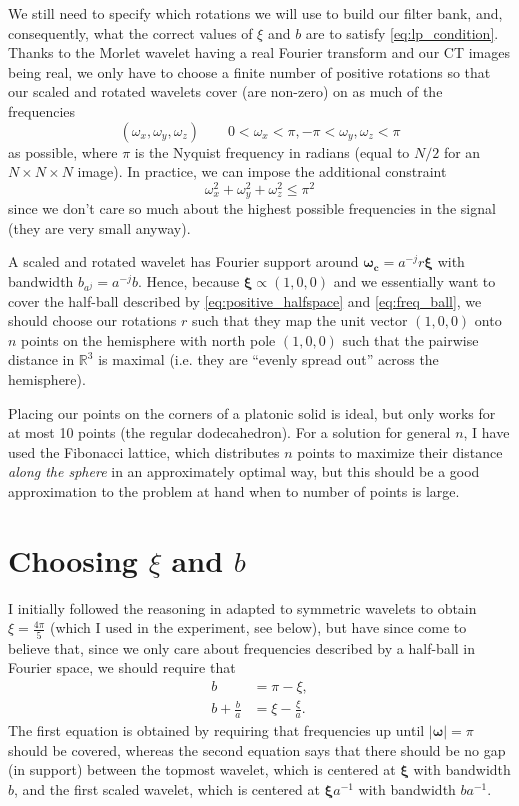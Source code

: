 \documentclass[twocolumn, openany, oneside, article]{memoir}
\begin{document}
We still need to specify which rotations we will use to build our filter bank, and, consequently, what the correct
values of $\xi$ and $b$ are to satisfy \autoref{eq:lp_condition}. Thanks to the Morlet wavelet having a real
Fourier transform and our CT images being real, we only have to choose a finite number of positive rotations so that our
scaled and rotated wavelets cover (are non-zero) on as much of the frequencies
\begin{equation}\label{eq:positive_halfspace}
(\omega_x, \omega_y, \omega_z) \qquad 0 < \omega_x < \pi, -\pi < \omega_y, \omega_z < \pi
\end{equation}
as possible, where $\pi$ is the Nyquist frequency in radians (equal to $N/2$ for an $N \times N \times N$ image). In practice, we can
impose the additional constraint
\begin{equation}\label{eq:freq_ball}
    \omega_{x}^2 + \omega_{y}^2 + \omega_{z}^2 \leq \pi^2
\end{equation}
since we don't care so much about the highest possible frequencies in the signal (they are very small anyway).

A scaled and rotated wavelet has Fourier support around $\bm{\omega_c} = a^{-j}r\bm{\xi}$ with bandwidth $b_{a^j} =
a^{-j}b$. Hence, because $\bm{\xi} \propto (1, 0, 0)$ and we essentially want to cover the half-ball described by
\autoref{eq:positive_halfspace} and \autoref{eq:freq_ball}, we should choose our rotations $r$ such that they map the
unit vector $(1, 0, 0)$ onto $n$ points on the hemisphere with north pole $(1, 0, 0)$ such that the pairwise distance in
$\mathbb{R}^3$ is maximal (i.e. they are \enquote{evenly spread out} across the hemisphere).

Placing our points on the corners of a platonic solid is ideal, but only works for at most 10 points (the regular
dodecahedron). For a solution for general $n$, I have used the Fibonacci lattice, which distributes $n$ points to
maximize their distance \emph{along the sphere} in an approximately optimal way, but this should be a good approximation
to the problem at hand when to number of points is large.


\section{Choosing $\xi$ and $b$}

I initially followed the reasoning in
\cite[Appendix~A]{lostanlen2017convolutional} adapted to symmetric wavelets to
obtain $\xi = \frac{4\pi}{5}$ (which I used in the experiment, see below), but
have since come to believe that, since  we only care about frequencies described
by a half-ball in Fourier space, we should require that
\begin{align}
  b &= \pi - \xi,\\
  b + \frac{b}{a} &= \xi - \frac{\xi}{a}.
\end{align}
The first equation is obtained by requiring
that frequencies up until $|\bm{\omega}| = \pi$ should be covered, whereas the
second equation says that there should be no gap (in support) between the
topmost wavelet, which is centered at $\bm{\xi}$ with bandwidth $b$, and the
first scaled wavelet, which is centered at $\bm{\xi}a^{-1}$ with bandwidth
$ba^{-1}$.
\end{document}
